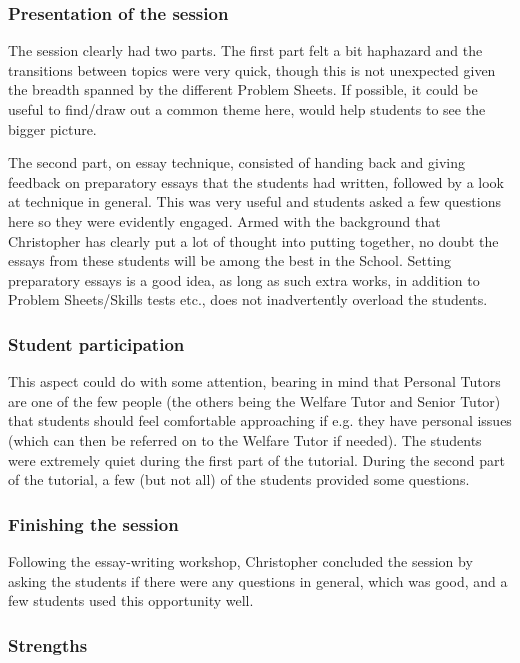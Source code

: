 \subsubsection{Presentation of the session}\label{sec:B-presentation}

The session clearly had two parts. The first part felt a bit haphazard and the transitions between topics were very quick, though this is not unexpected given the breadth spanned by the different Problem Sheets. If possible, it could be useful to find/draw out a common theme here, would help students to see the bigger picture.

The second part, on essay technique, consisted of handing back and giving feedback on preparatory essays that the students had written, followed by a look at technique in general. This was very useful and students asked a few questions here so they were evidently engaged. Armed with the background that Christopher has clearly put a lot of thought into putting together, no doubt the essays from these students will be among the best in the School. Setting preparatory essays is a good idea, as long as such extra works, in addition to Problem Sheets/Skills tests etc., does not inadvertently overload the students.

\subsubsection{Student participation}\label{sec:B-participation}

This aspect could do with some attention, bearing in mind that Personal Tutors are one of the few people (the others being the Welfare Tutor and Senior Tutor) that students should feel comfortable approaching if e.g. they have personal issues (which can then be referred on to the Welfare Tutor if needed). The students were extremely quiet during the first part of the tutorial. During the second part of the tutorial, a few (but not all) of the students provided some questions.

\subsubsection{Finishing the session}\label{sec:B-finish}

Following the essay-writing workshop, Christopher concluded the session by asking the students if there were any questions in general, which was good, and a few students used this opportunity well.

\subsubsection{Strengths}

